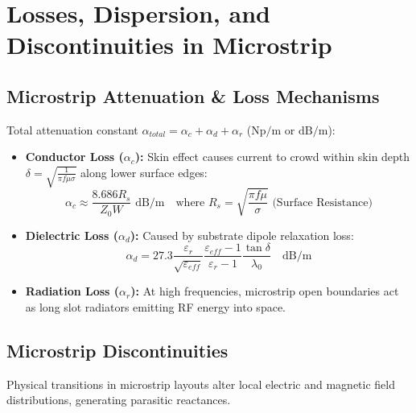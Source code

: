 \documentclass[10pt,a4paper]{article}
\begin{document}
\section{Losses, Dispersion, and Discontinuities in Microstrip}

\subsection{Microstrip Attenuation \& Loss Mechanisms}
Total attenuation constant $\alpha_{total} = \alpha_c + \alpha_d + \alpha_r$ ($\text{Np/m}$ or $\text{dB/m}$):

\begin{itemize}[leftmargin=*, itemsep=4pt]
  \item \textbf{Conductor Loss ($\alpha_c$):} Skin effect causes current to crowd within skin depth $\delta = \sqrt{\frac{1}{\pi f \mu \sigma}}$ along lower surface edges:
    \begin{equation}
      \alpha_c \approx \frac{8.686 R_s}{Z_0 W} \text{ dB/m} \quad \text{where } R_s = \sqrt{\frac{\pi f \mu}{\sigma}} \text{ (Surface Resistance)}
    \end{equation}
  \item \textbf{Dielectric Loss ($\alpha_d$):} Caused by substrate dipole relaxation loss:
    \begin{equation}
      \alpha_d = 27.3 \frac{\varepsilon_r}{\sqrt{\varepsilon_{eff}}} \frac{\varepsilon_{eff}-1}{\varepsilon_r-1} \frac{\tan\delta}{\lambda_0} \quad \text{dB/m}
    \end{equation}
  \item \textbf{Radiation Loss ($\alpha_r$):} At high frequencies, microstrip open boundaries act as long slot radiators emitting RF energy into space.
\end{itemize}

\subsection{Microstrip Discontinuities}
Physical transitions in microstrip layouts alter local electric and magnetic field distributions, generating parasitic reactances.
\end{document}
